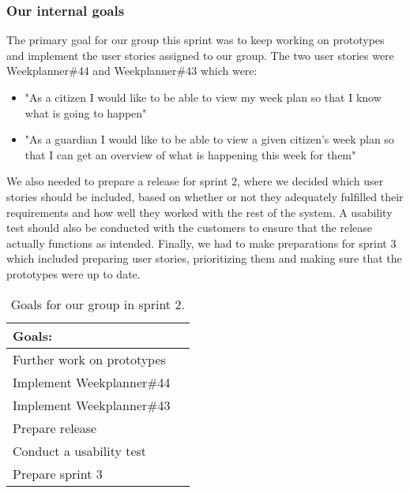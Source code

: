 \subsubsection{Our internal goals}
The primary goal for our group this sprint was to keep working on prototypes and implement the user stories assigned to our group.
The two user stories were Weekplanner\#44 and Weekplanner\#43 which were:
\begin{itemize}
 \item "As a citizen I would like to be able to view my week plan so that I know what is going to happen" 
 \item "As a guardian I would like to be able to view a given citizen's week plan so that I can get an overview of what is happening this week for them"
\end{itemize}
We also needed to prepare a release for sprint 2, where we decided which user stories should be included, based on whether or not they adequately fulfilled their requirements and how well they worked with the rest of the system.
A usability test should also be conducted with the customers to ensure that the release actually functions as intended.
Finally, we had to make preparations for sprint 3 which included preparing user stories, prioritizing them and making sure that the prototypes were up to date.
\begin{table}[H]
    \centering
    \begin{tabular}{|l|l|}
    \hline
    Goals:                                   \\ \hline
    Further work on prototypes              \\ \hline
    Implement Weekplanner\#44               \\ \hline
    Implement Weekplanner\#43               \\ \hline
    Prepare release                          \\ \hline
    Conduct a usability test                   \\ \hline
    Prepare sprint 3                         \\ \hline
    \end{tabular}
    \caption{Goals for our group in sprint 2.}
    \label{PO-goal-sprint-2}
\end{table}
